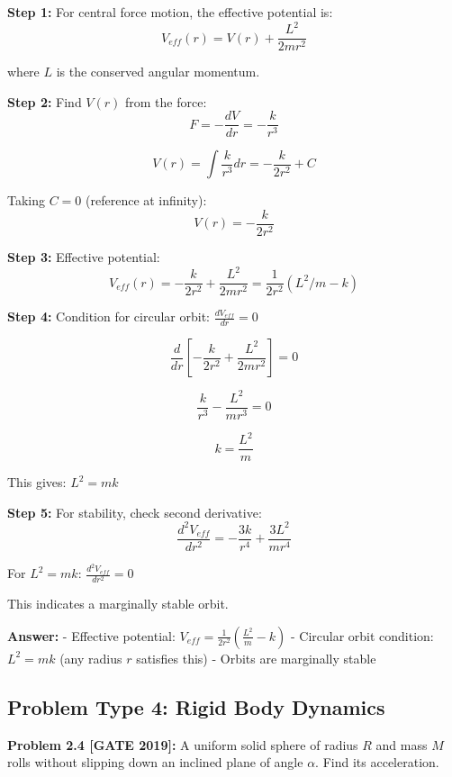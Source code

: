 \documentclass[12pt,a4paper]{article}
\begin{document}
\begin{solution}
\textbf{Step 1:} For central force motion, the effective potential is:
$$V_{eff}(r) = V(r) + \frac{L^2}{2mr^2}$$

where $L$ is the conserved angular momentum.

\textbf{Step 2:} Find $V(r)$ from the force:
$$F = -\frac{dV}{dr} = -\frac{k}{r^3}$$

$$V(r) = \int \frac{k}{r^3}dr = -\frac{k}{2r^2} + C$$

Taking $C = 0$ (reference at infinity):
$$V(r) = -\frac{k}{2r^2}$$

\textbf{Step 3:} Effective potential:
$$V_{eff}(r) = -\frac{k}{2r^2} + \frac{L^2}{2mr^2} = \frac{1}{2r^2}\left(L^2/m - k\right)$$

\textbf{Step 4:} Condition for circular orbit: $\frac{dV_{eff}}{dr} = 0$

$$\frac{d}{dr}\left[-\frac{k}{2r^2} + \frac{L^2}{2mr^2}\right] = 0$$

$$\frac{k}{r^3} - \frac{L^2}{mr^3} = 0$$

$$k = \frac{L^2}{m}$$

This gives: $L^2 = mk$

\textbf{Step 5:} For stability, check second derivative:
$$\frac{d^2V_{eff}}{dr^2} = -\frac{3k}{r^4} + \frac{3L^2}{mr^4}$$

For $L^2 = mk$: $\frac{d^2V_{eff}}{dr^2} = 0$

This indicates a marginally stable orbit.

\textbf{Answer:} 
- Effective potential: $V_{eff} = \frac{1}{2r^2}\left(\frac{L^2}{m} - k\right)$
- Circular orbit condition: $L^2 = mk$ (any radius $r$ satisfies this)
- Orbits are marginally stable
\end{solution}

\subsection{Problem Type 4: Rigid Body Dynamics}

\textbf{Problem 2.4 [GATE 2019]:} A uniform solid sphere of radius $R$ and mass $M$ rolls without slipping down an inclined plane of angle $\alpha$. Find its acceleration.
\end{document}
